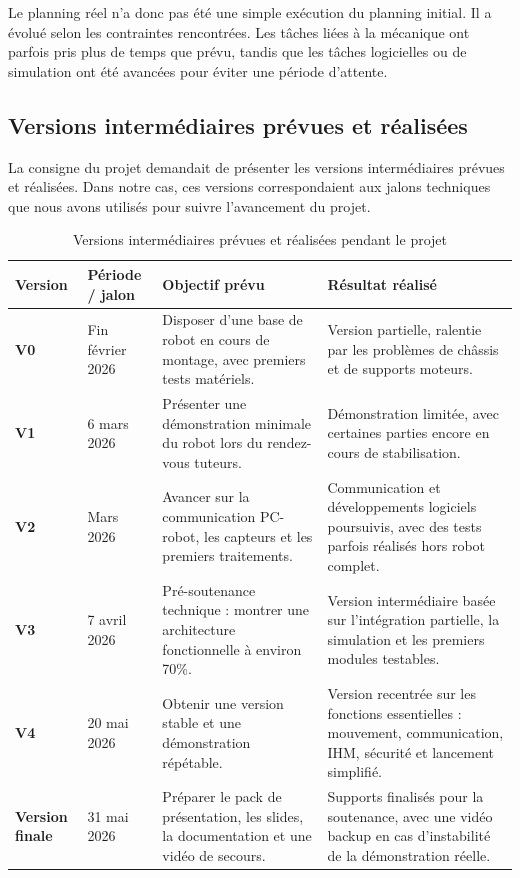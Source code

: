 \documentclass[11pt,a4paper]{report}
\begin{document}
Le planning réel n'a donc pas été une simple exécution du planning initial. Il a évolué selon les contraintes rencontrées. Les tâches liées à la mécanique ont parfois pris plus de temps que prévu, tandis que les tâches logicielles ou de simulation ont été avancées pour éviter une période d'attente.

\subsection{Versions intermédiaires prévues et réalisées}

La consigne du projet demandait de présenter les versions intermédiaires prévues et réalisées. Dans notre cas, ces versions correspondaient aux jalons techniques que nous avons utilisés pour suivre l'avancement du projet.

\begin{table}[H]
\centering
\small
\renewcommand{\arraystretch}{1.20}
\begin{tabular}{|p{2.4cm}|p{3.4cm}|p{5.2cm}|p{4.2cm}|}
\hline
\textbf{Version} & \textbf{Période / jalon} & \textbf{Objectif prévu} & \textbf{Résultat réalisé} \\
\hline
\textbf{V0} &
Fin février 2026 &
Disposer d'une base de robot en cours de montage, avec premiers tests matériels. &
Version partielle, ralentie par les problèmes de châssis et de supports moteurs. \\
\hline
\textbf{V1} &
6 mars 2026 &
Présenter une démonstration minimale du robot lors du rendez-vous tuteurs. &
Démonstration limitée, avec certaines parties encore en cours de stabilisation. \\
\hline
\textbf{V2} &
Mars 2026 &
Avancer sur la communication PC-robot, les capteurs et les premiers traitements. &
Communication et développements logiciels poursuivis, avec des tests parfois réalisés hors robot complet. \\
\hline
\textbf{V3} &
7 avril 2026 &
Pré-soutenance technique : montrer une architecture fonctionnelle à environ 70\%. &
Version intermédiaire basée sur l'intégration partielle, la simulation et les premiers modules testables. \\
\hline
\textbf{V4} &
20 mai 2026 &
Obtenir une version stable et une démonstration répétable. &
Version recentrée sur les fonctions essentielles : mouvement, communication, IHM, sécurité et lancement simplifié. \\
\hline
\textbf{Version finale} &
31 mai 2026 &
Préparer le pack de présentation, les slides, la documentation et une vidéo de secours. &
Supports finalisés pour la soutenance, avec une vidéo backup en cas d'instabilité de la démonstration réelle. \\
\hline
\end{tabular}
\caption{Versions intermédiaires prévues et réalisées pendant le projet}
\label{tab:versions_intermediaires}
\end{table}
\end{document}
